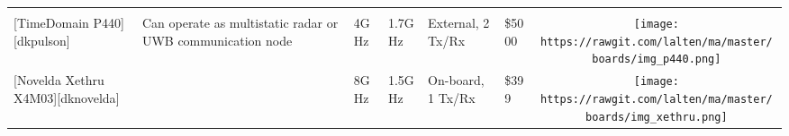 \begin{longtable}[]{@{}llllllc@{}}
\begin{minipage}[t]{0.10\columnwidth}
\end{minipage}\tabularnewline
\begin{minipage}[t]{0.09\columnwidth}\raggedright\strut
{[}TimeDomain P440{]}{[}dkpulson{]}\strut
\end{minipage} & \begin{minipage}[t]{0.13\columnwidth}\raggedright\strut
Can operate as multistatic radar or UWB communication node\strut
\end{minipage} & \begin{minipage}[t]{0.09\columnwidth}\raggedright\strut
4GHz\strut
\end{minipage} & \begin{minipage}[t]{0.11\columnwidth}\raggedright\strut
1.7GHz\strut
\end{minipage} & \begin{minipage}[t]{0.10\columnwidth}\raggedright\strut
External, 2 Tx/Rx\strut
\end{minipage} & \begin{minipage}[t]{0.15\columnwidth}\raggedright\strut
\$5000\strut
\end{minipage} & \begin{minipage}[t]{0.10\columnwidth}\centering\strut
\texttt{[image: https://rawgit.com/lalten/ma/master/boards/img\_p440.png]}\strut
\end{minipage}\tabularnewline
\begin{minipage}[t]{0.09\columnwidth}\raggedright\strut
{[}Novelda Xethru X4M03{]}{[}dknovelda{]}\strut
\end{minipage} & \begin{minipage}[t]{0.13\columnwidth}\raggedright\strut
\strut
\end{minipage} & \begin{minipage}[t]{0.09\columnwidth}\raggedright\strut
8GHz\strut
\end{minipage} & \begin{minipage}[t]{0.11\columnwidth}\raggedright\strut
1.5GHz\strut
\end{minipage} & \begin{minipage}[t]{0.10\columnwidth}\raggedright\strut
On-board, 1 Tx/Rx\strut
\end{minipage} & \begin{minipage}[t]{0.15\columnwidth}\raggedright\strut
\$399\strut
\end{minipage} & \begin{minipage}[t]{0.10\columnwidth}\centering\strut
\texttt{[image: https://rawgit.com/lalten/ma/master/boards/img\_xethru.png]}\strut

\end{minipage}
\end{longtable}
